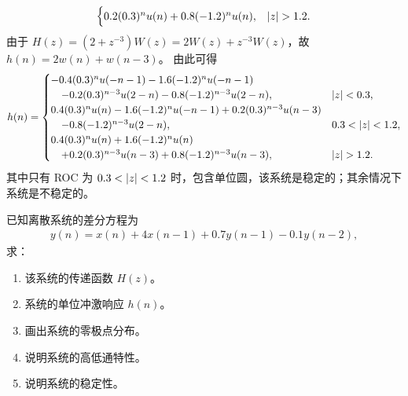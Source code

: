 \begin{solution}
\begin{enumerate}[label=(\arabic*)]
\begin{align*}
\begin{cases}
                        0.2(0.3)^nu(n) + 0.8(-1.2)^nu(n), & \left|z\right| > 1.2.
                    \end{cases}
            \end{align*}
            由于 $H(z) = (2 + z^{-3})W(z) = 2W(z) + z^{-3}W(z)$，故 $h(n) = 2w(n) + w(n - 3)$。
            由此可得
            \begin{align*}
                h(n) = \begin{cases}
                    -0.4(0.3)^nu(-n-1) - 1.6(-1.2)^nu(-n-1) \\
                    \quad - 0.2(0.3)^{n - 3}u(2 - n) - 0.8(-1.2)^{n - 3}u(2 - n), & \left|z\right| < 0.3, \\
                    0.4(0.3)^nu(n) - 1.6(-1.2)^nu(-n-1) + 0.2(0.3)^{n - 3}u(n - 3) \\
                    \quad - 0.8(-1.2)^{n - 3}u(2 - n), & 0.3 < \left|z\right| < 1.2, \\
                    0.4(0.3)^nu(n) + 1.6(-1.2)^nu(n) \\
                    \quad + 0.2(0.3)^{n - 3}u(n - 3) + 0.8(-1.2)^{n - 3}u(n - 3), & \left|z\right| > 1.2.
                \end{cases}
            \end{align*}
            其中只有 ROC 为 $0.3 < \left|z\right| < 1.2$ 时，包含单位圆，该系统是稳定的；其余情况下系统是不稳定的。
    \end{enumerate}
\end{solution}

\begin{exercise}
    已知离散系统的差分方程为
    \begin{align*}
        y(n) = x(n) + 4x(n - 1) + 0.7y(n - 1) - 0.1y(n - 2),
    \end{align*}
    求：
    \begin{enumerate}[label=(\arabic*)]
        \item 该系统的传递函数 $H(z)$。
        \item 系统的单位冲激响应 $h(n)$。
        \item 画出系统的零极点分布。
        \item 说明系统的高低通特性。
        \item 说明系统的稳定性。
    \end{enumerate}
\end{exercise}

